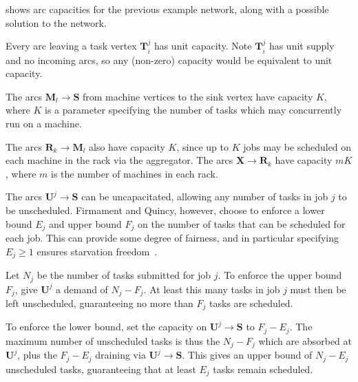  shows arc capacities for the previous example network, along with a possible solution to the network. 

Every arc leaving a task vertex $\mathbf{T}_i^j$ has unit capacity. Note $\mathbf{T}_i^j$ has unit supply and no incoming arcs, so any (non-zero) capacity would be equivalent to unit capacity.

The arcs $\mathbf{M}_l \to \mathbf{S}$ from machine vertices to the sink vertex have capacity $K$, where $K$ is a parameter specifying the number of tasks which may concurrently run on a machine\footnotemark.

The arcs $\mathbf{R}_k \to \mathbf{M}_l$ also have capacity $K$, since up to $K$ jobs may be scheduled on each machine in the rack via the aggregator. The arcs $\mathbf{X} \to \mathbf{R}_k$ have capacity $mK$, where $m$ is the number of machines in each rack\footnotemark.

The arcs $\mathbf{U}^j \to \mathbf{S}$ can be uncapacitated, allowing any number of tasks in job $j$ to be unscheduled. Firmament and Quincy, however, choose to enforce a lower bound $E_j$ and upper bound $F_j$ on the number of tasks that can be scheduled for each job. This can provide some degree of fairness, and in particular specifying $E_j \geq 1$ ensures starvation freedom~\cite[p.~19]{Isard:2009}.

Let $N_j$ be the number of tasks submitted for job $j$. To enforce the upper bound $F_j$, give $\mathbf{U}^j$ a demand of $N_j - F_j$. At least this many tasks in job $j$ must then be left unscheduled, guaranteeing no more than $F_j$ tasks are scheduled.

To enforce the lower bound, set the capacity on $\mathbf{U}^j \to \mathbf{S}$ to $F_j - E_j$. The maximum number of unscheduled tasks is thus the $N_j - F_j$ which are absorbed at $\mathbf{U}^j$, plus the $F_j - E_j$ draining via $\mathbf{U}^j \to \mathbf{S}$. This gives an upper bound of $N_j - E_j$ unscheduled tasks, guaranteeing that at least $E_j$ tasks remain scheduled.

